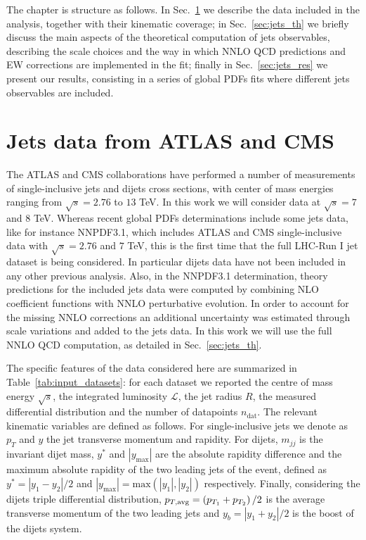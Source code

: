 %
The chapter is structure as follows. In Sec.~\ref{sec:jets_data} we describe the data included in the analysis,
together with their kinematic coverage; in Sec.~\ref{sec:jets_th} we briefly discuss the main aspects of the theoretical
computation of jets observables, describing the scale choices and the way in which NNLO QCD predictions and EW corrections 
are implemented in the fit; finally in Sec.~\ref{sec:jets_res} we present our results, consisting in a series of global
PDFs fits where different jets observables are included.

\section{Jets data from ATLAS and CMS}
\label{sec:jets_data}
The ATLAS and CMS collaborations have performed a number of measurements of single-inclusive jets and 
dijets cross sections, with center of mass energies ranging from $\sqrt{s}=2.76$ to $13$ TeV.
In this work we will consider data at $\sqrt{s}=7$ and $8$ TeV.
%
Whereas recent global PDFs determinations include some jets data, like for instance NNPDF3.1, which includes ATLAS and CMS 
single-inclusive data with $\sqrt{s}=2.76$ and $7$ TeV, this is the first time that the full LHC-Run I jet dataset is being 
considered. In particular dijets data have not been included in any other previous analysis.
Also, in the NNPDF3.1 determination, theory predictions for the included jets data were computed 
by combining NLO coefficient functions with NNLO perturbative evolution. In order to account for the
missing NNLO corrections an additional uncertainty was estimated through scale variations and added to the jets data.
In this work we will use the full NNLO QCD computation, as detailed in Sec.~\ref{sec:jets_th}.

%
The specific features of the data considered here are summarized in Table~\ref{tab:input_datasets}:
for each dataset we reported the centre of mass energy $\sqrt{s}$, 
the integrated luminosity $\mathcal{L}$, the jet radius $R$,
the measured differential distribution and the number of datapoints $n_{\text{dat}}$.
The relevant kinematic variables are defined as follows.
For single-inclusive jets we denote as $p_T$ and $y$ the jet transverse momentum and rapidity.
For dijets, $m_{jj}$ is the invariant dijet mass, $y^*$ and $|y_{\text{max}}|$ are the absolute rapidity difference
and the maximum absolute rapidity of the two leading jets of the event, defined as $y^*=|y_1-y_2|/2$
and $|y_{\text{max}}|= \text{max}\left(|y_1|,|y_2|\right)$ respectively.
Finally, considering the dijets triple differential distribution,
$p_{T,\rm avg} = \left(p_{T_1}+p_{T_2}\right)/2$ is the average transverse momentum of the two leading jets and 
$y_b = |y_1+y_2|/2$ is the boost of the dijets system.

